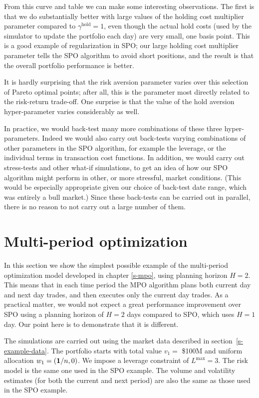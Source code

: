 \documentclass[openany]{now}
\renewcommand{\S}{section~}
\begin{document}
From this curve and table we can make some interesting observations.
The first is that we do substantially better with large values of
the holding cost multiplier parameter compared to $\gamma^\mathrm{hold}=1$,
even though the actual hold costs (used by the simulator to update the portfolio
each day) are very small, one basis point.  This is a good example of
regularization in SPO; our large holding cost multiplier parameter
tells the SPO algorithm to avoid short positions, and the result is that
the overall portfolio performance is better.

It is hardly surprising
that the risk aversion parameter varies over this selection of Pareto
optimal points; after all,
this is the parameter most directly related to the risk-return trade-off.
One surprise is that the value of the hold aversion hyper-parameter
varies considerably as well.

In practice, we would back-test many more combinations of these three
hyper-parameters.
Indeed we would also carry out back-tests varying combinations of
other parameters in the SPO algorithm, for example the leverage,
or the individual terms in transaction cost functions.  In addition, we
would carry out stress-tests and other what-if simulations, to get an idea
of how our SPO algorithm might perform in other, or more stressful,
market conditions.
(This would be especially appropriate given our choice of
back-test date range, which was entirely a bull market.)
Since these back-tests can be carried out in parallel, there is no
reason to not carry out a large number of them.

\section{Multi-period optimization}
In this section we show the simplest possible example
of the multi-period optimization model developed in chapter \ref{s-mpo},
using planning horizon $H=2$.  This means that in each time period
the MPO algorithm plans both current day and next day trades, and then
executes only the current day trades.
As a practical matter, we would not expect a great performance improvement
over SPO using a planning horizon of $H=2$ days compared to SPO, which uses
$H=1$ day.  Our point here is to demonstrate that it is different.

The simulations are carried out using the market
data described in \S\ref{s-example-data}.
The portfolio starts with total value $v_1 =$ \$100M and uniform allocation
$w_1 = (\mathbf 1/n,0)$.  We impose a leverage constraint of $L^\mathrm{max}=3$.
The risk model is the same one used in the SPO example.  The volume and volatility
estimates (for both the current and next period)
are also the same as those used in the SPO example.
\end{document}
